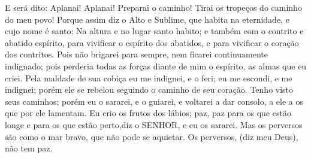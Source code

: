 {E será dito: Aplanai! Aplanai! Preparai o caminho! Tirai os tropeços do caminho do meu povo!
Porque assim diz o Alto e Sublime, que habita na eternidade, e cujo nome é santo: Na altura e no lugar santo habito; e também com o contrito e abatido espírito, para vivificar o espírito dos abatidos, e para vivificar o coração dos contritos.
Pois não brigarei para sempre, nem ficarei continuamente indignado; pois perderia todas as forças diante de mim o espírito, as almas que eu criei.
Pela maldade de sua cobiça eu me indignei, e o feri; eu me escondi, e me indignei; porém ele se rebelou seguindo o caminho de seu coração.
Tenho visto seus caminhos; porém eu o sararei, e o guiarei, e voltarei a dar consolo, a ele a os que por ele lamentam.
Eu crio os frutos dos lábios; paz, paz para os que estão longe e para os que estão perto,diz o SENHOR, e eu os sararei.
Mas os perversos são como o mar bravo, que não pode se aquietar.
Os perversos, (diz meu Deus), não tem paz.

}
